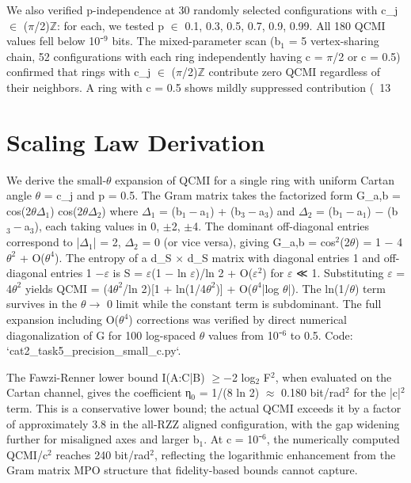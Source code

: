 \documentclass[aps,prl,showpacs]{revtex4-2}
\begin{document}
We also verified p-independence at 30 randomly selected configurations with c_j $\in$ ($\pi$/2)$\mathbb{Z}$: for each, we tested p $\in$ {0.1, 0.3, 0.5, 0.7, 0.9, 0.99}. All 180 QCMI values fell below 10⁻$^9$ bits. The mixed-parameter scan (b$_1$ = 5 vertex-sharing chain, 52 configurations with each ring independently having c = $\pi$/2 or c = 0.5) confirmed that rings with c_j $\in$ ($\pi$/2)$\mathbb{Z}$ contribute zero QCMI regardless of their neighbors. A ring with c = 0.5 shows mildly suppressed contribution (~13%


\section{Scaling Law Derivation}


We derive the small-$\theta$ expansion of QCMI for a single ring with uniform Cartan angle $\theta$ = c_j and p = 0.5. The Gram matrix takes the factorized form G_{a,b} = cos(2$\theta\Delta_1$) cos(2$\theta\Delta_2$) where $\Delta_1$ = (b$_1-$a$_1$) + (b$_3-$a$_3$) and $\Delta_2$ = (b$_1-$a$_1$) $-$ (b$_3-$a$_3$), each taking values in {0, $\pm$2, $\pm$4}. The dominant off-diagonal entries correspond to |$\Delta_1$| = 2, $\Delta_2$ = 0 (or vice versa), giving G_{a,b} = cos$^2$(2$\theta$) = 1 $-$ 4$\theta^2$ + O($\theta^4$). The entropy of a d_S $\times$ d_S matrix with diagonal entries 1 and off-diagonal entries 1 $-\varepsilon$ is S = $\varepsilon$(1 $-$ ln $\varepsilon$)/ln 2 + O($\varepsilon^2$) for $\varepsilon$ ≪ 1. Substituting $\varepsilon$ = 4$\theta^2$ yields QCMI = (4$\theta^2$/ln 2)[1 + ln(1/4$\theta^2$)] + O($\theta^4$|log $\theta$|). The ln(1/$\theta$) term survives in the $\theta\to$ 0 limit while the constant term is subdominant. The full expansion including O($\theta^4$) corrections was verified by direct numerical diagonalization of G for 100 log-spaced $\theta$ values from 10⁻$^6$ to 0.5. Code: `cat2_task5_precision_small_c.py`.


The Fawzi-Renner lower bound I(A:C|B) $\geq-$2 log$_2$ F$^2$, when evaluated on the Cartan channel, gives the coefficient η$_0$ = 1/(8 ln 2) $\approx$ 0.180 bit/rad$^2$ for the |c|$^2$ term. This is a conservative lower bound; the actual QCMI exceeds it by a factor of approximately 3.8 in the all-RZZ aligned configuration, with the gap widening further for misaligned axes and larger b$_1$. At c = 10⁻$^6$, the numerically computed QCMI/c$^2$ reaches 240 bit/rad$^2$, reflecting the logarithmic enhancement from the Gram matrix MPO structure that fidelity-based bounds cannot capture.
\end{document}
